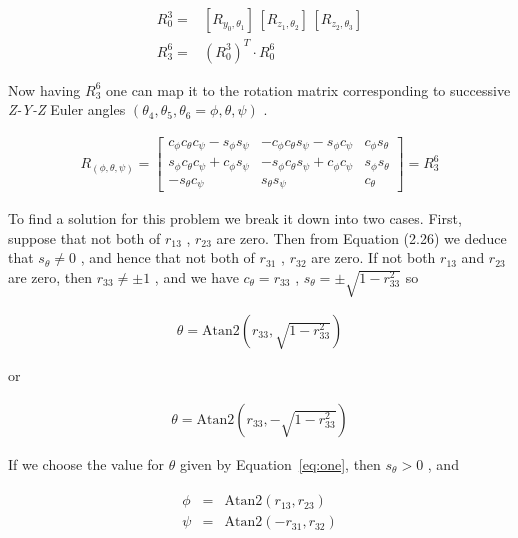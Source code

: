 \documentclass[12pt, a4paper]{article}
\begin{document}
\begin{align}
    R_0^3 = & [{R}_{y_0, \theta_1}] \, [{R}_{z_1, \theta_2}] \, [{R}_{z_2, \theta_3}] \\
    R_3^6=&\left(R_0^3\right)^T \cdot R_0^6
\end{align}

Now having \(R_3^6\) one can map it to the rotation matrix corresponding to successive \textit{Z-Y-Z} Euler angles \((\theta_4, \theta_5, \theta_6 = \phi, \theta, \psi)\) .

\begin{align}
R_{(\phi, \theta, \psi)} = \begin{bmatrix}
c_{\phi}c_{\theta}c_{\psi} - s_{\phi}s_{\psi} & -c_{\phi}c_{\theta}s_{\psi} - s_{\phi}c_{\psi} & c_{\phi}s_{\theta} \\
s_{\phi}c_{\theta}c_{\psi} + c_{\phi}s_{\psi} & -s_{\phi}c_{\theta}s_{\psi} + c_{\phi}c_{\psi} & s_{\phi}s_{\theta} \\
-s_{\theta}c_{\psi} & s_{\theta}s_{\psi} & c_{\theta}
\end{bmatrix} = R_3^6
\end{align}

\noindent To find a solution for this problem we break it down into two cases. First, suppose that not both of \(r_{13}\) , \(r_{23}\) are zero. Then from Equation (2.26) we deduce that \(s_{\theta} \neq 0\) , and hence that not both of \(r_{31}\) , \(r_{32}\) are zero. If not both \(r_{13}\) and \(r_{23}\) are zero, then \(r_{33} \neq \pm 1\) , and we have \(c_{\theta} = r_{33}\) , \(s_{\theta} = \pm \sqrt{1 - r_{33}^{2}}\) so

\begin{align}
\theta = \mathrm{Atan2}\left(r_{33},\sqrt{1 - r_{33}^{2}}\right) \label{eq:one}
\end{align}

or

\begin{align}
\theta = \mathrm{Atan2}\left(r_{33}, -\sqrt{1 - r_{33}^{2}}\right) \label{eq:two}
\end{align}

If we choose the value for \(\theta\) given by Equation~\ref{eq:one}, then \(s_{\theta} > 0\) , and

\begin{align}
\begin{array}{rcl}
\phi & = & \mathrm{Atan2}(r_{13}, r_{23}) \\
\psi & = & \mathrm{Atan2}(-r_{31}, r_{32})
\end{array} 
\end{align}
\end{document}
